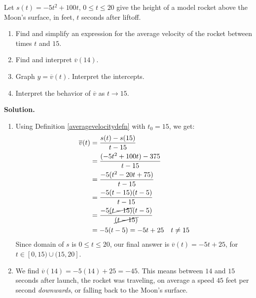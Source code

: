 \begin{ex}
\begin{ex} \label{averagevelocityrocketex} Let $s(t) = -5t^2+100t$, $0 \leq t \leq 20$ give the height of a model rocket above the Moon's surface, in feet,  $t$ seconds after liftoff.  

\begin{enumerate}

\item  Find and simplify an expression for the average velocity of the rocket between times $t$ and $15$.

\item Find and interpret $\overline{v}(14)$.

\item  Graph $y = \overline{v}(t)$. Interpret the intercepts.

\item Interpret the behavior of $\overline{v}$ as $t \rightarrow 15$.

\end{enumerate}

{\bf Solution.}

\begin{enumerate}

\item Using Definition \ref{averagevelocitydefn} with $t_{0} = 15$, we get: 
\begin{align*}
 \overline{v}(t) & = \dfrac{s(t) - s(15)}{t-15} \\
  & =  \dfrac{(-5t^2+100t) - 375}{t - 15}  \\
  & =  \dfrac{-5(t^2-20t+75)}{t - 15}  \\
  & = \dfrac{-5(t-15)(t-5)}{t-15}  \\
  & = \dfrac{-5\cancel{(t-15)} (t-5)}{\cancel{(t-15)}} \\
  & = -5(t-5) = -5t + 25 & \text{$t \neq 15$}
\end{align*}
Since  domain of $s$ is  $0 \leq t \leq 20$, our final answer is $\overline{v}(t) = -5t+25$,  for $t \in [0, 15) \cup (15, 20]$. 

\item  We find $\overline{v}(14) = -5(14)+25 = -45$.  This means between  $14$ and $15$ seconds after launch, the rocket was traveling, on average  a speed $45$ feet per second \textit{downwards}, or falling back to the Moon's surface.


\end{enumerate}
\end{ex}
\end{ex}
